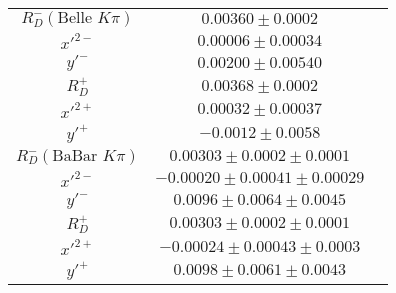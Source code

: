 \begin{table}[htdp]
\begin{center}
\begin{tabular}{|c|c|c|}
      $R_D^-(\text{Belle }K\pi)$&$ 0.00360\pm 0.0002$ & \\
      $x'^{2-}$& $0.00006\pm 0.00034$& \\
      $y'^-$&$0.00200\pm 0.00540$ & \\
      $R_D^+$& $0.00368\pm 0.0002$ & \\
      $x'^{2+}$& $0.00032\pm 0.00037$ & \\
      $y'^+$& $-0.0012\pm  0.0058$ & \\ \hline
      
      $R_D^-(\text{BaBar }K\pi)$& $0.00303\pm 0.0002\pm 0.0001$ & \\
      $x'^{2-}$& $-0.00020\pm 0.00041\pm 0.00029$ & \\
      $y'^-$& $0.0096\pm 0.0064\pm  0.0045$& \\
      $R_D^+$& $0.00303\pm 0.0002\pm 0.0001$ & \\
      $x'^{2+}$& $-0.00024\pm 0.00043\pm 0.0003$ & \\
      $y'^+$& $0.0098\pm 0.0061\pm 0.0043$ & \\ \hline
      
    \end{tabular}
  \end{center}
  \label{table:all_cpv_meas}
\end{table}%
